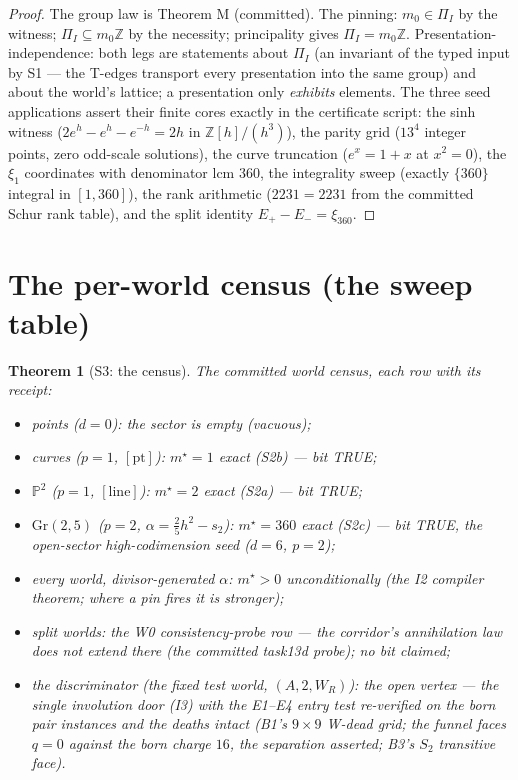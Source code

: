 \documentclass[11pt]{article}
\newtheorem{theorem}{Theorem}
\begin{document}
\begin{proof}
The group law is Theorem M (committed). The pinning: $m_0\in\Pi_I$ by the
witness; $\Pi_I\subseteq m_0\mathbb Z$ by the necessity; principality gives
$\Pi_I=m_0\mathbb Z$. Presentation-independence: both legs are statements
about $\Pi_I$ (an invariant of the typed input by S1 --- the T-edges transport
every presentation into the same group) and about the world's lattice; a
presentation only \emph{exhibits} elements. The three seed applications assert
their finite cores exactly in the certificate script: the sinh witness
($2e^h-e^h-e^{-h}=2h$ in $\mathbb Z[h]/(h^3)$), the parity grid
($13^4$ integer points, zero odd-scale solutions), the curve truncation
($e^x=1+x$ at $x^2=0$), the $\xi_1$ coordinates with denominator lcm $360$,
the integrality sweep (exactly $\{360\}$ integral in $[1,360]$), the rank
arithmetic ($2231=2231$ from the committed Schur rank table), and the split
identity $E_+-E_-=\xi_{360}$.
\end{proof}

\section{The per-world census (the sweep table)}

\begin{theorem}[S3: the census]
\label{thm:s3}
The committed world census, each row with its receipt:
\begin{itemize}
\item \emph{points} ($d=0$): the sector is empty (vacuous);
\item \emph{curves} ($p=1$, $[\mathrm{pt}]$): $m^\star=1$ exact (S2b) --- bit TRUE;
\item \emph{$\mathbb P^2$} ($p=1$, $[\mathrm{line}]$): $m^\star=2$ exact (S2a) --- bit TRUE;
\item \emph{$\mathrm{Gr}(2,5)$} ($p=2$, $\alpha=\tfrac25h^2-s_2$): $m^\star=360$
exact (S2c) --- bit TRUE, the open-sector high-codimension seed ($d=6$, $p=2$);
\item \emph{every world, divisor-generated $\alpha$}: $m^\star>0$
\emph{unconditionally} (the I2 compiler theorem; where a pin fires it is stronger);
\item \emph{split worlds}: the W0 consistency-probe row --- the corridor's
annihilation law does not extend there (the committed task13d probe); no bit claimed;
\item \emph{the discriminator} (the fixed test world, $(A,2,W_R)$): the
\emph{open vertex} --- the single involution door (I3) with the E1--E4 entry
test re-verified on the born pair instances and the deaths intact (B1's
$9\times9$ W-dead grid; the funnel faces $q=0$ against the born charge $16$,
the separation asserted; B3's $S_2$ transitive face).
\end{itemize}
\end{theorem}
\end{document}
